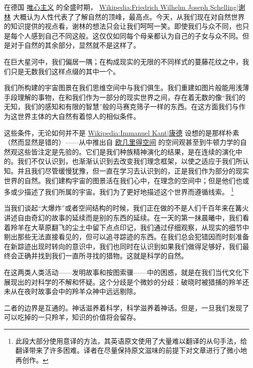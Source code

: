     在德国
\href{http://toyhouse.cc/wiki/index.php/唯心主义}{唯心主义}
的全盛时期，
\href{http://toyhouse.cc/wiki/index.php/Wikipedia:Friedrich Wilhelm Joseph Schelling|谢林}{Wikipedia:Friedrich Wilhelm Joseph Schelling|谢林}
大概认为人性代表了了解自然的顶峰，最高点。今天，从我们现在对自然世界的知识提供的视点看，谢林的想法只会让我们呵呵一笑。即使我们与众不同，也只是每个人感到自己不同这般。这仅仅如同每个母亲都认为自己的子女与众不同。但是对于自然的其余部分，显然就不是这样了。

    在巨大星河中，我们偏居一隅；在构成现实的无限的不同样式的蔓藤花纹之中，我们只是无数我们这样点缀的其中一个。

    我们所构建的宇宙图景在我们思维空间中与我们俱生。我们重建如图片般能用浅薄手段理解的事物，在和我们作为一部分的现实世界之间，存在着无数的像“我们的无知，我们的感知和有限的智慧”般的马赛克筛子一样的东西。在这方面我们与作为这世界主体的大自然有着惊人的相似条件。

    这些条件，无论如何并不是
\href{http://toyhouse.cc/wiki/index.php/Wikipedia:Immanuel Kant|康德}{Wikipedia:Immanuel Kant|康德}
设想的是那样朴素（然而显然是错的）——从中推出自
\href{http://toyhouse.cc/wiki/index.php/欧几里得空间}{欧几里得空间}
的空间观甚至到牛顿力学的自然观这些皆注定是先验的。它们是我们种族精神演化的结果，是在连续的演化中的。我们不仅认识到，也渐渐认识到去改变我们理念框架，以使之适应于我们所认知。并且我们尽管缓慢犹豫，但一直在学习去认识到的，正是我们作为部分的现实世界的自然。我们建构宇宙的图景活在我们心中，在理念的空间中；但是他们也或多或少描述了我们所属的宇宙。我们为了更好地描述这个世界而遵循线索。
\footnote[2]
{
此段大部分使用意译的方法，其英语原文使用了大量难以翻译的从句手法，给翻译带来了许多困难。译者在尽量保持原文滋味的前提下对文章进行了微小地再创作。
}

    当我们谈起“大爆炸”或者空间结构的时候，我们正在做的不是人们千百年来在篝火讲述自由奇幻的故事的延续而是别的东西的延续。在一天的第一抹晨曦中，我们看着羚羊在大草原翻飞的尘土中留下点点印记，我们通过仔细观察，从现实的细节中剔出那些无法直接看见的，但可以追寻踪迹的东西。在我们总会犯错因而时刻准备在新踪迹出现时转向的意识中，我们也同时在认识到如果我们做得足够好，我们最终会正确并找到我们一直所寻找的猎物。这就是科学的自然。

    在这两类人类活动——发明故事和按图索骥——中的困惑，就是在我们当代文化下展现出的对科学的不解和怀疑。这个分歧是个微妙的分歧：破晓时被猎捕的羚羊还未从在夜时故事会中的羚羊众神中远远剔除。

    二者的边界是互通的。神话滋养着科学，科学滋养着神话。但是，一旦我们发现了可以吃掉的一只羚羊，知识的价值将会留存。

